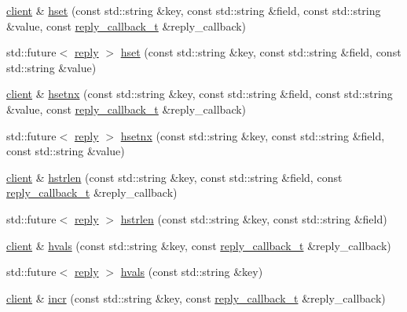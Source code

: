 \begin{DoxyCompactItemize}
\item 
\hyperlink{classcpp__redis_1_1client}{client} \& \hyperlink{classcpp__redis_1_1client_a3d5367719dc31fb3dfa49202d1e7f9ad}{hset} (const std\+::string \&key, const std\+::string \&field, const std\+::string \&value, const \hyperlink{classcpp__redis_1_1client_a061a1140d36d2eaeda82b09a0bb3f9f2}{reply\+\_\+callback\+\_\+t} \&reply\+\_\+callback)
\item 
std\+::future$<$ \hyperlink{classcpp__redis_1_1reply}{reply} $>$ \hyperlink{classcpp__redis_1_1client_ae212c8371dbd9ceff386f789226eb173}{hset} (const std\+::string \&key, const std\+::string \&field, const std\+::string \&value)
\item 
\hyperlink{classcpp__redis_1_1client}{client} \& \hyperlink{classcpp__redis_1_1client_a6cf21d60012fc82075deb801a32e8d60}{hsetnx} (const std\+::string \&key, const std\+::string \&field, const std\+::string \&value, const \hyperlink{classcpp__redis_1_1client_a061a1140d36d2eaeda82b09a0bb3f9f2}{reply\+\_\+callback\+\_\+t} \&reply\+\_\+callback)
\item 
std\+::future$<$ \hyperlink{classcpp__redis_1_1reply}{reply} $>$ \hyperlink{classcpp__redis_1_1client_a72b5a16cc761f51e9986bcfcf644e999}{hsetnx} (const std\+::string \&key, const std\+::string \&field, const std\+::string \&value)
\item 
\hyperlink{classcpp__redis_1_1client}{client} \& \hyperlink{classcpp__redis_1_1client_a5e1543cd782d3ff9d17de5e200fd038a}{hstrlen} (const std\+::string \&key, const std\+::string \&field, const \hyperlink{classcpp__redis_1_1client_a061a1140d36d2eaeda82b09a0bb3f9f2}{reply\+\_\+callback\+\_\+t} \&reply\+\_\+callback)
\item 
std\+::future$<$ \hyperlink{classcpp__redis_1_1reply}{reply} $>$ \hyperlink{classcpp__redis_1_1client_a612c5f64a9fec6c8c2df8b113173146a}{hstrlen} (const std\+::string \&key, const std\+::string \&field)
\item 
\hyperlink{classcpp__redis_1_1client}{client} \& \hyperlink{classcpp__redis_1_1client_af74a8adbcd6f21178b43f3f2edddb472}{hvals} (const std\+::string \&key, const \hyperlink{classcpp__redis_1_1client_a061a1140d36d2eaeda82b09a0bb3f9f2}{reply\+\_\+callback\+\_\+t} \&reply\+\_\+callback)
\item 
std\+::future$<$ \hyperlink{classcpp__redis_1_1reply}{reply} $>$ \hyperlink{classcpp__redis_1_1client_af391940cf5b996a0682e881da446b7da}{hvals} (const std\+::string \&key)
\item 
\hyperlink{classcpp__redis_1_1client}{client} \& \hyperlink{classcpp__redis_1_1client_a2f9ba6c7e83451207403096b19da4faa}{incr} (const std\+::string \&key, const \hyperlink{classcpp__redis_1_1client_a061a1140d36d2eaeda82b09a0bb3f9f2}{reply\+\_\+callback\+\_\+t} \&reply\+\_\+callback)

\end{DoxyCompactItemize}

